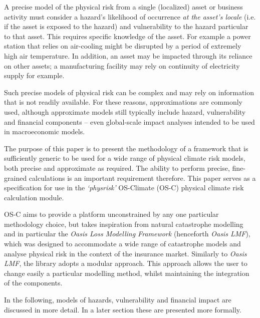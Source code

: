 \documentclass[a4paper,11pt]{extarticle} %
\theoremstyle{definition}
\begin{document}
A precise model of the physical risk from a single (localized) asset or business activity must consider a hazard's likelihood of occurrence \emph{at the asset's locale} (i.e. if the asset is exposed to the hazard) and vulnerability to the hazard particular to that asset. This requires specific knowledge of the asset. For example a power station that relies on air-cooling might be disrupted by a period of extremely high air temperature. In addition, an asset may be impacted through its reliance on other assets; a manufacturing facility may rely on continuity of electricity supply for example.

Such precise models of physical risk can be complex and may rely on information that is not readily available. For these reasons, approximations are commonly used, although approximate models still typically include hazard, vulnerability and financial components \cite{BertramEtAl:2020,WoetzelEtAl:2020} -- even global-scale impact analyses intended to be used in macroeconomic models.

The purpose of this paper is to present the methodology of a framework that is sufficiently generic to be used for a wide range of physical climate risk models, both precise and approximate as required. The ability to perform precise, fine-grained calculations is an important requirement therefore. This paper serves as a specification for use in the \emph{`physrisk'} OS-Climate (OS-C) \cite{OSC} physical climate risk calculation module.

OS-C aims to provide a platform unconstrained by any one particular methodology choice, but takes inspiration from natural catastrophe modelling \cite{MitchellEtAl:2017} and in particular the \emph{Oasis Loss Modelling Framework} \cite{OasisLMF} (henceforth \emph{Oasis LMF}), which was designed to accommodate a wide range of catastrophe models and analyse physical risk in the context of the insurance market. Similarly to \emph{Oasis LMF}, the library adopts a modular approach. This approach allows the user to change easily a particular modelling method, whilst maintaining the integration of the components.

In the following, models of hazards, vulnerability and financial impact are discussed in more detail. In a later section these are presented more formally.
\end{document}
